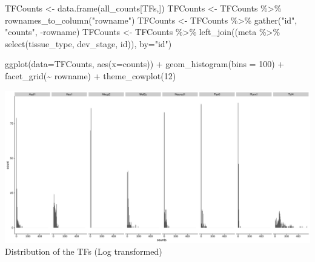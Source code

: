 \documentclass[
]{article}
\newenvironment{Shaded}{\begin{snugshade}}{\end{snugshade}}
\newcommand{\AttributeTok}[1]{\textcolor[rgb]{0.77,0.63,0.00}{#1}}
\newcommand{\DecValTok}[1]{\textcolor[rgb]{0.00,0.00,0.81}{#1}}
\newcommand{\FunctionTok}[1]{\textcolor[rgb]{0.00,0.00,0.00}{#1}}
\newcommand{\NormalTok}[1]{#1}
\newcommand{\OtherTok}[1]{\textcolor[rgb]{0.56,0.35,0.01}{#1}}
\newcommand{\SpecialCharTok}[1]{\textcolor[rgb]{0.00,0.00,0.00}{#1}}
\newcommand{\StringTok}[1]{\textcolor[rgb]{0.31,0.60,0.02}{#1}}
\begin{document}
\begin{Shaded}
\begin{Highlighting}[]
\NormalTok{TFCounts }\OtherTok{\textless{}{-}} \FunctionTok{data.frame}\NormalTok{(all\_counts[TFs,])}
\NormalTok{TFCounts }\OtherTok{\textless{}{-}}\NormalTok{ TFCounts }\SpecialCharTok{\%\textgreater{}\%} \FunctionTok{rownames\_to\_column}\NormalTok{(}\StringTok{"rowname"}\NormalTok{)}
\NormalTok{TFCounts }\OtherTok{\textless{}{-}}\NormalTok{ TFCounts }\SpecialCharTok{\%\textgreater{}\%} \FunctionTok{gather}\NormalTok{(}\StringTok{"id"}\NormalTok{, }\StringTok{"counts"}\NormalTok{, }\SpecialCharTok{{-}}\NormalTok{rowname)}
\NormalTok{TFCounts }\OtherTok{\textless{}{-}}\NormalTok{ TFCounts }\SpecialCharTok{\%\textgreater{}\%} \FunctionTok{left\_join}\NormalTok{((meta }\SpecialCharTok{\%\textgreater{}\%} \FunctionTok{select}\NormalTok{(tissue\_type, dev\_stage, id)), }\AttributeTok{by=}\StringTok{"id"}\NormalTok{)}

\FunctionTok{ggplot}\NormalTok{(}\AttributeTok{data=}\NormalTok{TFCounts, }\FunctionTok{aes}\NormalTok{(}\AttributeTok{x=}\NormalTok{counts)) }\SpecialCharTok{+} \FunctionTok{geom\_histogram}\NormalTok{(}\AttributeTok{bins =} \DecValTok{100}\NormalTok{) }\SpecialCharTok{+} \FunctionTok{facet\_grid}\NormalTok{(}\SpecialCharTok{\textasciitilde{}}\NormalTok{  rowname) }\SpecialCharTok{+} \FunctionTok{theme\_cowplot}\NormalTok{(}\DecValTok{12}\NormalTok{)}
\end{Highlighting}
\end{Shaded}

\includegraphics{Exploration_files/figure-latex/unnamed-chunk-19-1.pdf}
Distribution of the TFs (Log transformed)
\end{document}

